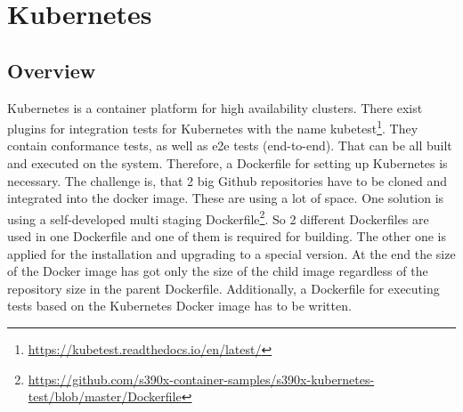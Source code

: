 \chapter{Kubernetes}\label{ch:kubernetes}

\section{Overview}

Kubernetes is a container platform for high availability clusters.
There exist plugins for integration tests for Kubernetes with the name kubetest\footnote{\url{https://kubetest.readthedocs.io/en/latest/}}. They contain conformance tests, as well as e2e tests (end-to-end).
That can be all built and executed on the system. Therefore, a Dockerfile for setting up Kubernetes is necessary. The challenge is, that 2 big Github repositories have to be cloned and integrated into the docker image. These are using a lot of space. One solution is using a self-developed multi staging Dockerfile\footnote{\url{https://github.com/s390x-container-samples/s390x-kubernetes-test/blob/master/Dockerfile}}. 
So 2 different Dockerfiles are used in one Dockerfile and one of them is required for building. The other one is applied for the installation and upgrading to a special version. At the end the size of the Docker image has got only the size of the child image regardless of the repository size in the parent Dockerfile.
Additionally, a Dockerfile for executing tests based on the Kubernetes Docker image has to be written.


